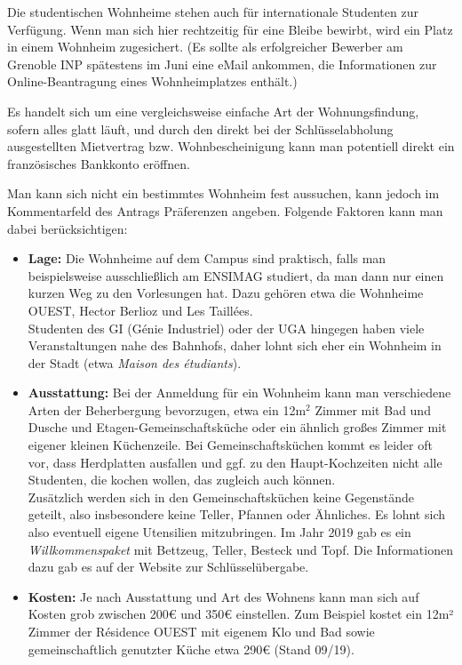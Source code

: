 \documentclass[11pt,a4paper]{article}
\begin{document}
	Die studentischen Wohnheime stehen auch für internationale Studenten zur Verfügung. Wenn man sich hier rechtzeitig für eine Bleibe bewirbt, wird ein Platz in einem Wohnheim zugesichert. (Es sollte als erfolgreicher Bewerber am Grenoble INP spätestens im Juni eine eMail ankommen, die Informationen zur Online-Beantragung eines Wohnheimplatzes enthält.)
	
	Es handelt sich um eine vergleichsweise einfache Art der Wohnungsfindung, sofern alles glatt läuft, und durch den direkt bei der Schlüsselabholung ausgestellten Mietvertrag bzw. Wohnbescheinigung kann man potentiell direkt ein französisches Bankkonto eröffnen.
	
	Man kann sich nicht ein bestimmtes Wohnheim fest aussuchen, kann jedoch im Kommentarfeld des Antrags Präferenzen angeben. Folgende Faktoren kann man dabei berücksichtigen:
	
	\begin{itemize}
		\item \textbf{Lage:} Die Wohnheime auf dem Campus sind praktisch, falls man beispielsweise ausschließlich am ENSIMAG studiert, da man dann nur einen kurzen Weg zu den Vorlesungen hat. Dazu gehören etwa die Wohnheime OUEST, Hector Berlioz und Les Taillées. \\
		Studenten des GI (Génie Industriel) oder der UGA hingegen haben viele Veranstaltungen nahe des Bahnhofs, daher lohnt sich eher ein Wohnheim in der Stadt (etwa \emph{Maison des étudiants}).
  \item \textbf{Ausstattung:} Bei der Anmeldung für ein Wohnheim kann man verschiedene Arten der Beherbergung bevorzugen, etwa ein 12m$^2$ Zimmer mit Bad und Dusche und Etagen-Gemeinschaftsküche oder ein ähnlich großes Zimmer mit eigener kleinen Küchenzeile. Bei Gemeinschaftsküchen kommt es leider oft vor, dass Herdplatten ausfallen und ggf. zu den Haupt-Kochzeiten nicht alle Studenten, die kochen wollen, das zugleich auch können.\\
    Zusätzlich werden sich in den Gemeinschaftsküchen keine Gegenstände geteilt, also insbesondere keine Teller, Pfannen oder Ähnliches. Es lohnt sich also eventuell eigene Utensilien mitzubringen. Im Jahr 2019 gab es ein \textit{Willkommenspaket} mit Bettzeug, Teller, Besteck und Topf. Die Informationen dazu gab es auf der Website zur Schlüsselübergabe.
		\item \textbf{Kosten:} Je nach Ausstattung und Art des Wohnens kann man sich auf Kosten grob zwischen 200€ und 350€ einstellen. Zum Beispiel kostet ein 12m² Zimmer der Résidence OUEST mit eigenem Klo und Bad sowie gemeinschaftlich genutzter Küche etwa 290€ (Stand 09/19).
	\end{itemize}
\end{document}
